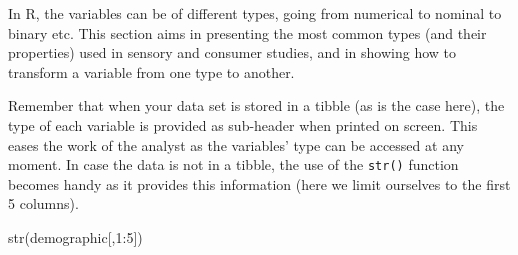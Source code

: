 \documentclass[
]{krantz}
\makeatletter
\newenvironment{Shaded}{\begin{snugshade}}{\end{snugshade}}
\newcommand{\AttributeTok}[1]{\textcolor[rgb]{0.61,0.61,0.61}{#1}}
\newcommand{\DecValTok}[1]{\textcolor[rgb]{0.06,0.06,0.06}{#1}}
\newcommand{\FunctionTok}[1]{\textcolor[rgb]{0,0,0}{#1}}
\newcommand{\NormalTok}[1]{#1}
\newcommand{\OtherTok}[1]{\textcolor[rgb]{0.37,0.37,0.37}{#1}}
\newcommand{\SpecialCharTok}[1]{\textcolor[rgb]{0,0,0}{#1}}
\newcommand{\StringTok}[1]{\textcolor[rgb]{0.5,0.5,0.5}{#1}}
\newenvironment{kframe}{%
\medskip{}
\setlength{\fboxsep}{.8em}
 \def\at@end@of@kframe{}%
 \ifinner\ifhmode%
  \def\at@end@of@kframe{\end{minipage}}%
  \begin{minipage}{\columnwidth}%
 \fi\fi%
 \def\FrameCommand##1{\hskip\@totalleftmargin \hskip-\fboxsep
 \colorbox{shadecolor}{##1}\hskip-\fboxsep
     \hskip-\linewidth \hskip-\@totalleftmargin \hskip\columnwidth}%
 \MakeFramed {\advance\hsize-\width
   \@totalleftmargin\z@ \linewidth\hsize
   \@setminipage}}%
 {\par\unskip\endMakeFramed%
 \at@end@of@kframe}
\renewenvironment{Shaded}{\begin{kframe}}{\end{kframe}}
\makeatother
\begin{document}
\begin{Shaded}
\end{Shaded}

In R, the variables can be of different types, going from numerical to nominal to binary etc. This section aims in presenting the most common types (and their properties) used in sensory and consumer studies, and in showing how to transform a variable from one type to another.

Remember that when your data set is stored in a tibble (as is the case here), the type of each variable is provided as sub-header when printed on screen. This eases the work of the analyst as the variables' type can be accessed at any moment. In case the data is not in a tibble, the use of the \texttt{str()} function becomes handy as it provides this information (here we limit ourselves to the first 5 columns).

\begin{Shaded}
\begin{Highlighting}[]
\FunctionTok{str}\NormalTok{(demographic[,}\DecValTok{1}\SpecialCharTok{:}\DecValTok{5}\NormalTok{])}
\end{Highlighting}
\end{Shaded}
\end{document}
